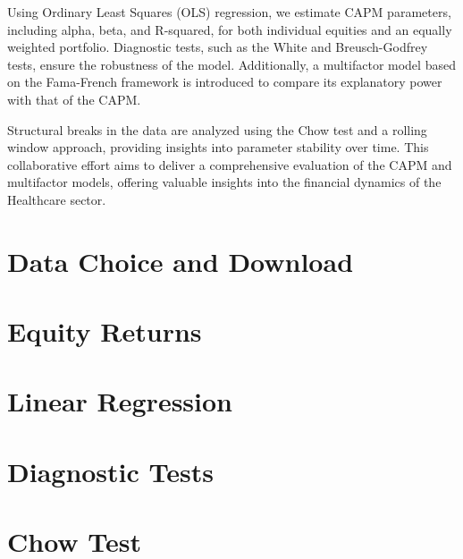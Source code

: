 \documentclass[12pt, openright, oneside]{report}
\begin{document}
Using Ordinary Least Squares (OLS) regression, we estimate CAPM parameters, including alpha, beta, and R-squared, for both 
individual equities and an equally weighted portfolio. Diagnostic tests, such as the White and Breusch-Godfrey tests, ensure 
the robustness of the model. Additionally, a multifactor model based on the Fama-French framework is introduced to compare its
explanatory power with that of the CAPM.

Structural breaks in the data are analyzed using the Chow test and a rolling window approach, providing insights into 
parameter stability over time. This collaborative effort aims to deliver a comprehensive evaluation of the CAPM and 
multifactor models, offering valuable insights into the financial dynamics of the Healthcare sector.
\chapter{Data Choice and Download}
\label{chapter:download}

\chapter{Equity Returns}\label{chapter:equity_returns}


\chapter{Linear Regression}\label{chapter:linear_regression}


\chapter{Diagnostic Tests}\label{chapter:diagnostic_tests}


\chapter{Chow Test}\label{chapter:chow_test}

\end{document}

